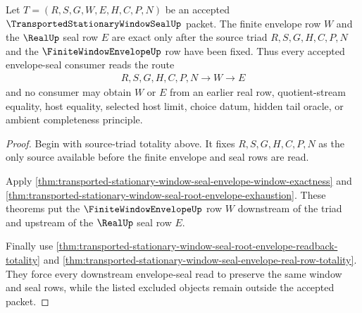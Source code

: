 \begin{theorem}
\label{thm:transported-stationary-window-seal-envelope-seal-exactness-obligation}
Let $T=(R,S,G,W,E,H,C,P,N)$ be an accepted $\TransportedStationaryWindowSealUp$ packet. The finite envelope row $W$ and the $\RealUp$ seal row $E$ are exact only after the source triad $R,S,G,H,C,P,N$ and the $\FiniteWindowEnvelopeUp$ row have been fixed. Thus every accepted envelope-seal consumer reads the route
$$
\begin{aligned}
  R,S,G,H,C,P,N \to W \to E
\end{aligned}
$$
and no consumer may obtain $W$ or $E$ from an earlier real row, quotient-stream equality, host equality, selected host limit, choice datum, hidden tail oracle, or ambient completeness principle.
\end{theorem}
\begin{proof}
Begin with source-triad totality above. It fixes $R,S,G,H,C,P,N$ as the only source available before the finite envelope and seal rows are read.

Apply \autoref{thm:transported-stationary-window-seal-envelope-window-exactness} and \autoref{thm:transported-stationary-window-seal-root-envelope-exhaustion}. These theorems put the $\FiniteWindowEnvelopeUp$ row $W$ downstream of the triad and upstream of the $\RealUp$ seal row $E$.

Finally use \autoref{thm:transported-stationary-window-seal-root-envelope-readback-totality} and \autoref{thm:transported-stationary-window-seal-envelope-real-row-totality}. They force every downstream envelope-seal read to preserve the same window and seal rows, while the listed excluded objects remain outside the accepted packet.
\end{proof}

